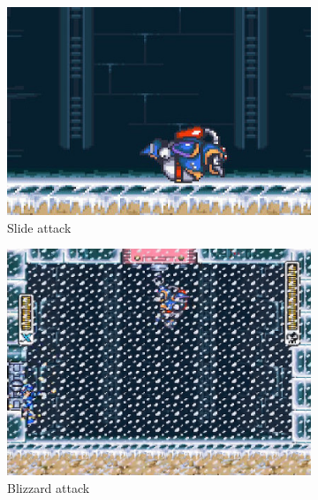 \begin{figure}[htp]
\begin{subfigure}{0.4\textwidth}
		\includegraphics[width=\linewidth]{figures/X1/Chill_penguin/Chill_slide.jpg}
		\caption{Slide attack}
	\end{subfigure}
	\begin{subfigure}[t]{0.5\textwidth}
		\centering
		\includegraphics[width=\linewidth]{figures/X1/Chill_penguin/Chill_blizzard.jpg}
		\caption{Blizzard attack}
	\end{subfigure}
	\begin{subfigure}[t]{0.35\textwidth}
		\centering

\end{subfigure}
\end{figure}
